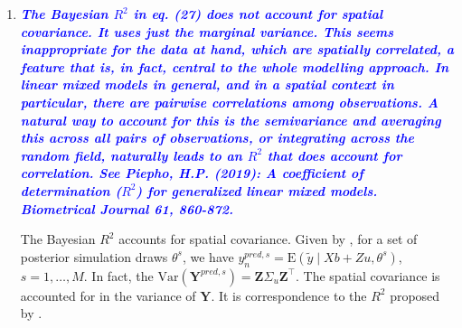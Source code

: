 \documentclass[a4paper]{article}   	%
\newcommand{\E}{\mathrm{E}}
\newcommand{\Var}{\mathrm{Var}}
\newcommand{\qtitle}[1]{\textit{\textbf{#1}}}
\begin{document}
\begin{enumerate}
    
    \item \qtitle{\textcolor{blue}{The Bayesian $R^2$ in eq. (27) does not account for spatial covariance. It uses just the marginal variance. This seems inappropriate for the data at hand, which are spatially correlated, a feature that is, in fact, central to the whole modelling approach. In linear mixed models in general, and in a spatial context in particular, there are pairwise correlations among observations. A natural way to account for this is the semivariance and averaging this across all pairs of observations, or integrating across the random field, naturally leads to an $R^2$ that does account for correlation. See Piepho, H.P. (2019): A coefficient of determination ($R^2$) for generalized linear mixed models. Biometrical Journal 61, 860-872.}}
        
    
	

    
    The Bayesian $R^2$ accounts for spatial covariance. Given by \textcite{Gelman2019Rsquared}, for a set of posterior simulation draws $\theta^s$, we have $y_n^{pred,s} = \E(\tilde{y}\mid Xb+Zu,\theta^s)$, $s=1,\ldots,M$. In fact, the $\Var(\bm{Y}^{pred,s}) = \bm{Z}\Sigma_u\bm{Z}^\top$. The spatial covariance is accounted for in the variance of $\bm{Y}$. It is correspondence to the $R^2$ proposed by \textcite{Piepho2019Coefficient}.
    

\end{enumerate}
\end{document}
